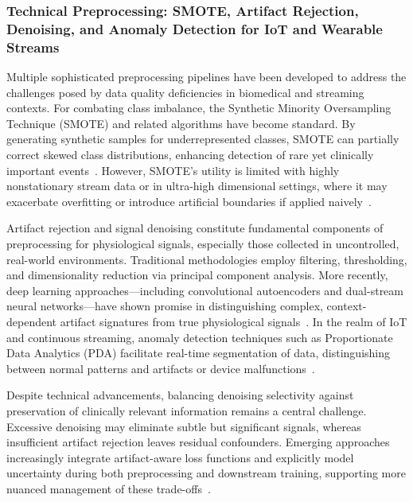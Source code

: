 \subsubsection{Technical Preprocessing: SMOTE, Artifact Rejection, Denoising, and Anomaly Detection for IoT and Wearable Streams}

Multiple sophisticated preprocessing pipelines have been developed to address the challenges posed by data quality deficiencies in biomedical and streaming contexts. For combating class imbalance, the Synthetic Minority Oversampling Technique (SMOTE) and related algorithms have become standard. By generating synthetic samples for underrepresented classes, SMOTE can partially correct skewed class distributions, enhancing detection of rare yet clinically important events~\cite{ref89,ref102}. However, SMOTE’s utility is limited with highly nonstationary stream data or in ultra-high dimensional settings, where it may exacerbate overfitting or introduce artificial boundaries if applied naively~\cite{ref106}.

Artifact rejection and signal denoising constitute fundamental components of preprocessing for physiological signals, especially those collected in uncontrolled, real-world environments. Traditional methodologies employ filtering, thresholding, and dimensionality reduction via principal component analysis. More recently, deep learning approaches—including convolutional autoencoders and dual-stream neural networks—have shown promise in distinguishing complex, context-dependent artifact signatures from true physiological signals~\cite{ref96,ref97}. In the realm of IoT and continuous streaming, anomaly detection techniques such as Proportionate Data Analytics (PDA) facilitate real-time segmentation of data, distinguishing between normal patterns and artifacts or device malfunctions~\cite{ref90}.

Despite technical advancements, balancing denoising selectivity against preservation of clinically relevant information remains a central challenge. Excessive denoising may eliminate subtle but significant signals, whereas insufficient artifact rejection leaves residual confounders. Emerging approaches increasingly integrate artifact-aware loss functions and explicitly model uncertainty during both preprocessing and downstream training, supporting more nuanced management of these trade-offs~\cite{ref106}.

